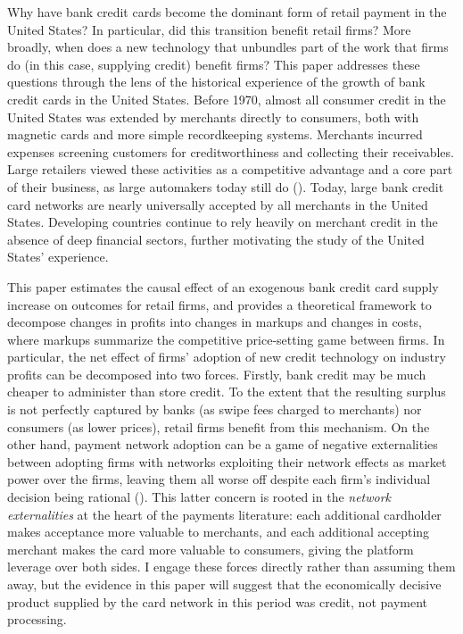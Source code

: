 \documentclass[12pt,english]{article}
\begin{document}
Why have bank credit cards become the dominant form of retail payment in the United States? In particular, did this transition benefit retail firms? More broadly, when does a new technology that unbundles part of the work that firms do (in this case, supplying credit) benefit firms? This paper addresses these questions through the lens of the historical experience of the growth of bank credit cards in the United States. Before 1970, almost all consumer credit in the United States was extended by merchants directly to consumers, both with magnetic cards and more simple recordkeeping systems. Merchants incurred expenses screening customers for creditworthiness and collecting their receivables. Large retailers viewed these activities as a competitive advantage and a core part of their business, as large automakers today still do (\cite{benetton_credit_2022}). Today, large bank credit card networks are nearly universally accepted by all merchants in the United States. Developing countries continue to rely heavily on merchant credit in the absence of deep financial sectors, further motivating the study of the United States' experience. 

This paper estimates the causal effect of an exogenous bank credit card supply increase on outcomes for retail firms, and provides a theoretical framework to decompose changes in profits into changes in markups and changes in costs, where markups summarize the competitive price-setting game between firms. In particular, the net effect of firms' adoption of new credit technology on industry profits can be decomposed into two forces. Firstly, bank credit may be much cheaper to administer than store credit. To the extent that the resulting surplus is not perfectly captured by banks (as swipe fees charged to merchants) nor consumers (as lower prices), retail firms benefit from this mechanism. On the other hand, payment network adoption can be a game of negative externalities between adopting firms with networks exploiting their network effects as market power over the firms, leaving them all worse off despite each firm's individual decision being rational (\cite{rochet_cooperation_2002, rochet_platform_2003, edelman_price_2015, wang_regulating_2023}). This latter concern is rooted in the \emph{network externalities} at the heart of the payments literature: each additional cardholder makes acceptance more valuable to merchants, and each additional accepting merchant makes the card more valuable to consumers, giving the platform leverage over both sides. I engage these forces directly rather than assuming them away, but the evidence in this paper will suggest that the economically decisive product supplied by the card network in this period was credit, not payment processing.
\end{document}
